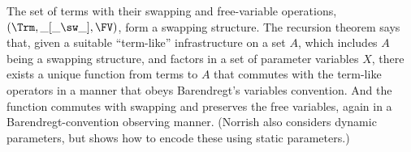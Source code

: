 The set of terms %
with their %
swapping and free-variable operations, %
$(\Trm,\_[\_\sw\_],\FV)$, form a swapping structure. 
The %
recursion theorem says that, given a suitable ``term-like'' infrastructure on a set $A$, which includes $A$ being a swapping structure, and 
factors in a %
set of parameter variables $X$, %
%
there exists a unique function from terms to $A$ that commutes with the term-like operators in a manner that obeys Barendregt's variables convention. %
And the 
function commutes with swapping and preserves the free variables, again in a Barendregt-convention observing manner. 
(Norrish also considers dynamic parameters,  
but	\citet[Ex.~5.6]{pitts-AlphaStructural} shows %
	how to encode %
	these using static %
	parameters.)   

